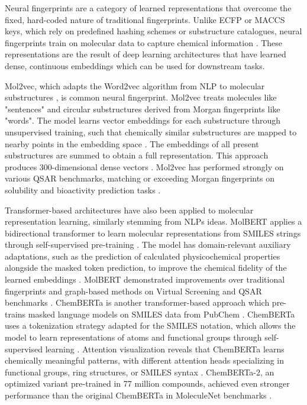 Neural fingerprints are a category of learned  representations that overcome the fixed, hard-coded nature of traditional fingerprints. Unlike ECFP or MACCS keys, which rely on predefined hashing schemes or substructure catalogues, neural fingerprints train on molecular data to capture chemical information \citep{Jaeger2018, Chithrananda2020}. These representations are the result of deep learning architectures that have learned dense, continuous embeddings which can be used for downstream tasks. 

Mol2vec, which adapts the Word2vec algorithm from NLP to molecular substructures \citep{Jaeger2018}, is common neural fingerprint. Mol2vec treats molecules like "sentences" and circular substructures derived from Morgan fingerprints like "words". The model learns vector embeddings for each substructure through unsupervised training, such that chemically similar substructures are mapped to nearby points in the embedding space \citep{Jaeger2018}. The embeddings of all present substructures are summed to obtain a full representation. This approach produces 300-dimensional dense vectors \citep{Jaeger2018}. Mol2vec has performed strongly on various QSAR benchmarks, matching or exceeding Morgan fingerprints on solubility and bioactivity prediction tasks \citep{Jaeger2018}.

Transformer-based architectures have also been applied to molecular representation learning, similarly stemming from NLPs ideas. MolBERT applies a bidirectional transformer to learn molecular representations from SMILES strings through self-supervised pre-training \citep{Fabian2020}. The model has domain-relevant auxiliary adaptations, such as the prediction of calculated physicochemical properties alongside the masked token prediction, to improve the chemical fidelity of the learned embeddings \citep{Fabian2020}. MolBERT demonstrated improvements over traditional fingerprints and graph-based methods on Virtual Screening and QSAR benchmarks \citep{Fabian2020}. ChemBERTa is another transformer-based approach which pre-trains masked language models on SMILES data from PubChem \citep{Chithrananda2020}.  ChemBERTa uses a tokenization strategy adapted for the SMILES notation, which allows the model to learn representations of atoms and functional groups through self-supervised learning \citep{Chithrananda2020}. Attention visualization reveals that ChemBERTa learns chemically meaningful patterns, with different attention heads specializing in functional groups, ring structures, or SMILES syntax \citep{Chithrananda2020}. ChemBERTa-2, an optimized variant pre-trained in 77 million compounds, achieved even stronger performance than the original ChemBERTa in MoleculeNet benchmarks \citep{Ahmad2022}.

